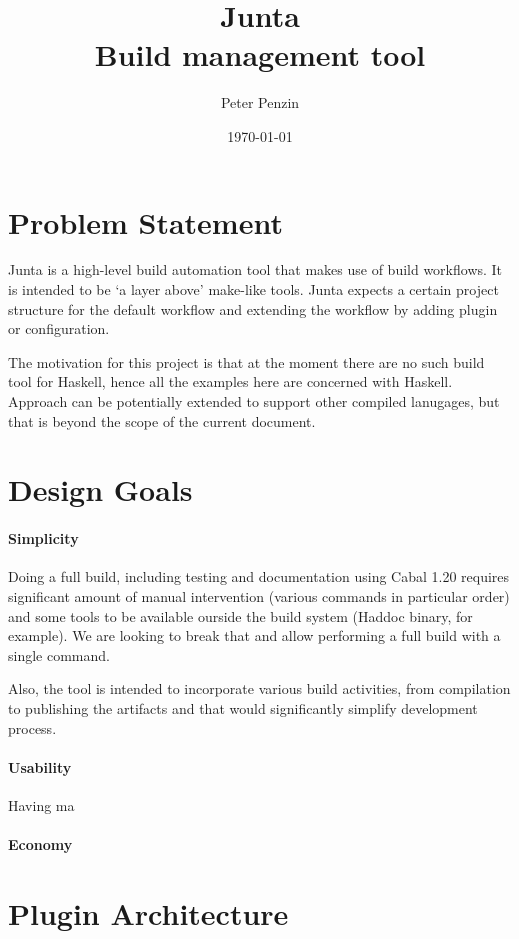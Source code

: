 \documentclass[11pt]{article}
\title{Junta\\Build management tool}
\author{Peter Penzin}
\date{\today}
\begin{document}
\maketitle

\section{Problem Statement}
Junta is a high-level build automation tool that makes use of build workflows.
It is intended to be `a layer above' make-like tools. Junta expects a certain
project structure for the default workflow and extending the workflow by adding
plugin or configuration.

The motivation for this project is that at the moment there are no such build
tool for Haskell, hence all the examples here are concerned with Haskell.
Approach can be potentially extended to support other compiled lanugages, but
that is beyond the scope of the current document.

\section{Design Goals}

\paragraph{Simplicity}
Doing a full build, including testing and documentation using Cabal 1.20
requires significant amount of manual intervention (various commands in
particular order) and some tools to be available ourside the build system
(Haddoc binary, for example). We are looking to break that and allow performing
a full build with a single command.

Also, the tool is intended to incorporate various build activities, from
compilation to publishing the artifacts and that would significantly simplify
development process.

\paragraph{Usability}
Having ma

\paragraph{Economy}

\section{Plugin Architecture}
\end{document}
